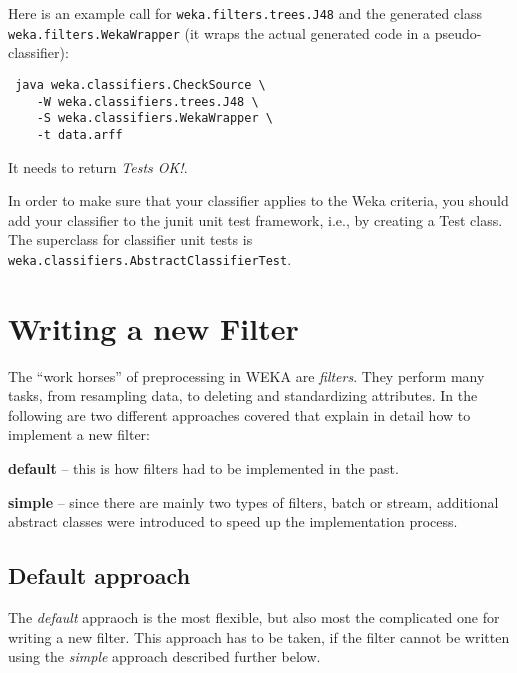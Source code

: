 Here is an example call for \texttt{weka.filters.trees.J48} and the
generated class \texttt{weka.filters.WekaWrapper} (it wraps the actual generated
code in a pseudo-classifier):
\begin{verbatim}
 java weka.classifiers.CheckSource \
    -W weka.classifiers.trees.J48 \
    -S weka.classifiers.WekaWrapper \
    -t data.arff
\end{verbatim}
It needs to return \textit{Tests OK!}.

In order to make sure that your classifier applies to the Weka criteria, you
should add your classifier to the junit unit test framework, i.e., by creating a
Test class. The superclass for classifier unit tests is
\texttt{weka.classifiers.AbstractClassifierTest}.


\newpage
\section{Writing a new Filter}
The ``work horses'' of preprocessing in WEKA are \textit{filters}. They perform
many tasks, from resampling data, to deleting and standardizing attributes. In
the following are two different approaches covered that explain in detail how
to implement a new filter:
\begin{tight_itemize}
  \item \textbf{default} -- this is how filters had to be implemented in the
past.
  \item \textbf{simple }-- since there are mainly two types of filters, batch or
stream, additional abstract classes were introduced to speed up
the implementation process.
\end{tight_itemize}

\subsection{Default approach}
The \textit{default} appraoch is the most flexible, but also most the
complicated one for writing a new filter. This approach has to be taken, if the
filter cannot be
written using the \textit{simple} approach described further below.


